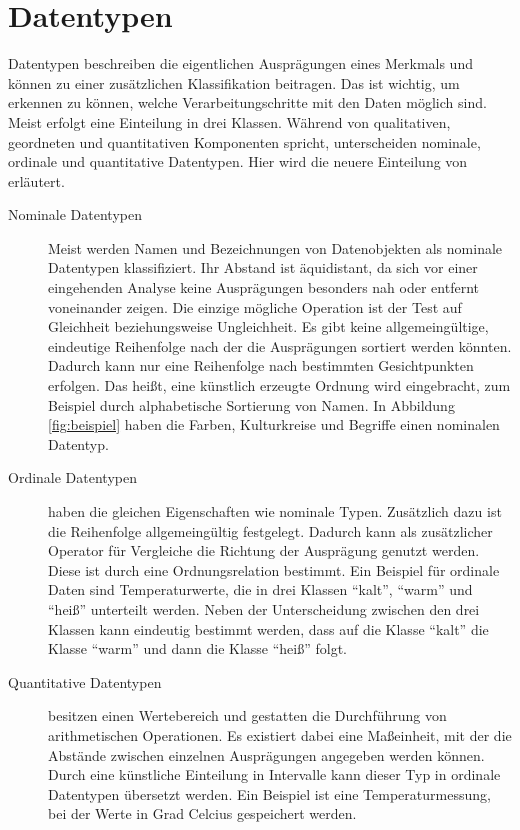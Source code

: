 \documentclass[a4paper, 
               12pt,
               DIV=calc,
               version=first,
               pdftex,
               headsepline,
               footsepline,
               bibtotocnumbered,
               liststotocnumbered]{scrreprt}
\begin{document}
\section{Datentypen}
\label{sec:Datentypen}
Datentypen beschreiben die eigentlichen Ausprägungen eines Merkmals und können zu einer zusätzlichen
Klassifikation beitragen. Das ist wichtig, um erkennen zu können, welche Verarbeitungschritte mit den Daten
möglich sind. Meist erfolgt eine Einteilung in drei Klassen. Während \cite{Bertin} von qualitativen,
geordneten und quantitativen Komponenten spricht, unterscheiden \cite{Preim} nominale, ordinale und
quantitative Datentypen.
Hier wird die neuere Einteilung von \cite{Preim} erläutert.
\begin{description}
\item[Nominale Datentypen]
Meist werden Namen und Bezeichnungen von Datenobjekten als nominale Datentypen klassifiziert.
Ihr Abstand ist äquidistant, da sich vor einer eingehenden Analyse
keine Ausprägungen besonders nah oder entfernt voneinander zeigen. Die einzige mögliche Operation ist der Test auf
Gleichheit beziehungsweise Ungleichheit. Es gibt keine allgemeingültige, eindeutige Reihenfolge
nach der die Ausprägungen sortiert werden könnten. Dadurch kann nur eine Reihenfolge nach bestimmten Gesichtpunkten erfolgen.
Das heißt, eine künstlich erzeugte Ordnung wird eingebracht, zum Beispiel durch alphabetische Sortierung von Namen.
In Abbildung \ref{fig:beispiel} haben die Farben, Kulturkreise und Begriffe einen nominalen Datentyp.
\item[Ordinale Datentypen]
haben die gleichen Eigenschaften wie nominale Typen.
Zusätzlich dazu ist die Reihenfolge allgemeingültig festgelegt. Dadurch kann als zusätzlicher Operator für Vergleiche die Richtung der
Ausprägung genutzt werden. Diese ist durch eine Ordnungsrelation bestimmt. Ein Beispiel für ordinale Daten sind Temperaturwerte,
die in drei Klassen "`kalt"', "`warm"' und "`heiß"' unterteilt werden. Neben der Unterscheidung zwischen den drei
Klassen kann eindeutig bestimmt werden, dass auf die Klasse "`kalt"' die Klasse "`warm"' und dann die Klasse
"`heiß"' folgt. 
\item[Quantitative Datentypen] besitzen einen Wertebereich und gestatten die Durchführung von arithmetischen Operationen.
Es existiert dabei eine Maßeinheit, mit der die Abstände zwischen einzelnen Ausprägungen angegeben werden können. Durch eine 
künstliche Einteilung in Intervalle kann dieser Typ in ordinale Datentypen übersetzt werden.
Ein Beispiel ist eine Temperaturmessung, bei der Werte in Grad Celcius gespeichert werden.
\end{description}
\end{document}
